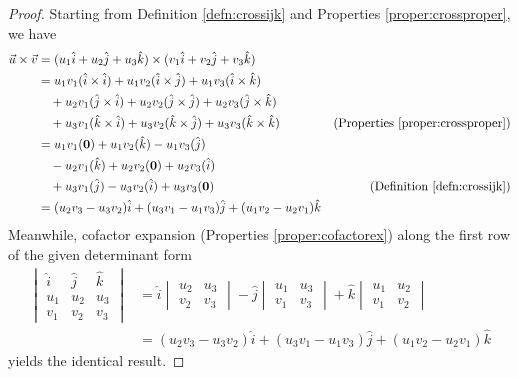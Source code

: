 \begin{proof}
Starting from Definition \ref{defn:crossijk} and Properties \ref{proper:crossproper}, we have
\begin{align*}
\vec{u} \times \vec{v} &= (u_1\hat{i} + u_2\hat{j} + u_3\hat{k}) \times (v_1\hat{i} + v_2\hat{j} + v_3\hat{k}) \\
&= u_1v_1(\hat{i}\times\hat{i}) + u_1v_2(\hat{i}\times\hat{j}) + u_1v_3(\hat{i}\times\hat{k}) \\
&\quad +u_2v_1(\hat{j}\times\hat{i}) + u_2v_2(\hat{j}\times\hat{j}) + u_2v_3(\hat{j}\times\hat{k}) \\
&\quad +u_3v_1(\hat{k}\times\hat{i}) + u_3v_2(\hat{k}\times\hat{j}) + u_3v_3(\hat{k}\times\hat{k}) & \text{(Properties \ref{proper:crossproper})}\\
&= u_1v_1(\textbf{0}) + u_1v_2(\hat{k}) - u_1v_3(\hat{j}) \\
&\quad -u_2v_1(\hat{k}) + u_2v_2(\textbf{0}) + u_2v_3(\hat{i}) \\
&\quad +u_3v_1(\hat{j}) - u_3v_2(\hat{i}) + u_3v_3(\textbf{0}) & \text{(Definition \ref{defn:crossijk})}\\
&= (u_2v_3 - u_3v_2)\hat{i} + (u_3v_1 - u_1v_3)\hat{j} + (u_1v_2 - u_2v_1)\hat{k} 
\end{align*}
Meanwhile, cofactor expansion (Properties \ref{proper:cofactorex}) along the first row of the given determinant form
\begin{align*}
\begin{vmatrix}
\hat{i} & \hat{j} & \hat{k} \\
u_1 & u_2 & u_3 \\
v_1 & v_2 & v_3
\end{vmatrix} 
&= 
\hat{i}
\begin{vmatrix}
u_2 & u_3 \\
v_2 & v_3
\end{vmatrix} 
- \hat{j}
\begin{vmatrix}
u_1 & u_3 \\
v_1 & v_3
\end{vmatrix} 
+ \hat{k}
\begin{vmatrix}
u_1 & u_2 \\
v_1 & v_2
\end{vmatrix} \\
&= (u_2v_3 - u_3v_2)\hat{i} + (u_3v_1 - u_1v_3)\hat{j} + (u_1v_2 - u_2v_1)\hat{k}
\end{align*}
yields the identical result.
\end{proof}

